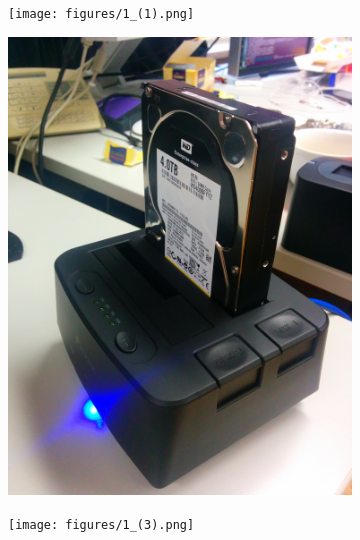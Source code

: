 \documentclass[[12pt,DIV14,BCOR12mm,a4paper,footexclude,headinclude,halfparskip-,twoside,openright,cleardoubleempty,idxtotoc,bibtotoc]{article}
\begin{document}
\begin{figure}[ht]
	\centering
	\begin{subfigure}[b]{0.29\textwidth}
	       \texttt{[image: figures/1\_(1).png]}
	       \caption{}
		\label{fig_hw_a}
	\end{subfigure} 
	\begin{subfigure}[b]{0.30\textwidth}
	      \includegraphics[width=\textwidth]{figures/n1.jpg}
	      \caption{}
		\label{fig_hw_b}
	\end{subfigure}	        
	\begin{subfigure}[b]{0.30\textwidth}
	       \texttt{[image: figures/1\_(3).png]}
	       \caption{}
	\label{fig_hw_c}
	\end{subfigure}


\end{figure}
\end{document}
